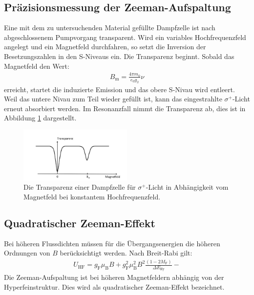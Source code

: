 \subsection{Präzisionsmessung der Zeeman-Aufspaltung}
Eine mit dem zu untersuchenden Material gefüllte Dampfzelle ist nach abgeschlossenem Pumpvorgang transparent.
Wird ein variables Hochfrequenzfeld angelegt und ein Magnetfeld durchfahren, so setzt die Inversion der Besetzungszahlen in den S-Niveaus ein. Die Transparenz
beginnt. Sobald das Magnetfeld den Wert:
\begin{align}
  B_\mathrm{m}=\frac{4\pi m_\mathrm{0}}{e_\mathrm{0}g_\mathrm{J}}\nu
\end{align}
erreicht, startet die induzierte Emission und das obere S-Nivau wird
entleert. Weil das untere Nivau zum Teil wieder gefüllt ist, kann das
eingestrahlte $\sigma^+$-Licht erneut absorbiert werden.
Im Resonanzfall nimmt die Transparenz ab, dies ist in Abbildung \ref{fig:Transparenz}
dargestellt.
\begin{figure}
    \centering
    \includegraphics[width=0.5\textwidth]{transparenz.PNG}
    \caption{Die Transparenz einer Dampfzelle für $\sigma^+$-Licht in Abhängigkeit vom Magnetfeld
    bei konstantem Hochfrequenzfeld.\cite{skript}}
    \label{fig:Transparenz}
\end{figure}

\subsection{Quadratischer Zeeman-Effekt}
Bei höheren Flussdichten müssen für die Übergangsenergien die höheren Ordnungen von $B$ berücksichtigt werden. Nach Breit-Rabi gilt:
\begin{align}
  U_\mathrm{HF}=g_\mathrm{F}\mu_\mathrm{B}B+ g^2_\mathrm{F}\mu^2_\mathrm{B}B^2\frac{(1-2M_\mathrm{F})}{\Delta E_\mathrm{Hy}}-
\end{align}
Die Zeeman-Aufspaltung ist bei höheren Magnetfeldern abhängig von der Hyperfeinstruktur. Dies wird als quadratischer Zeeman-Effekt bezeichnet.

